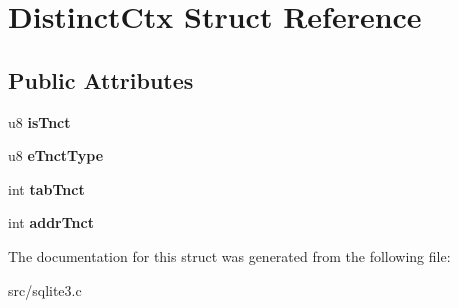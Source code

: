 \hypertarget{struct_distinct_ctx}{\section{Distinct\-Ctx Struct Reference}
\label{struct_distinct_ctx}
}
\subsection*{Public Attributes}
\begin{DoxyCompactItemize}
\item 
\hypertarget{struct_distinct_ctx_aaaa3b23ad86358ba11b4da77cd753bbd}{u8 {\bfseries is\-Tnct}}\label{struct_distinct_ctx_aaaa3b23ad86358ba11b4da77cd753bbd}

\item 
\hypertarget{struct_distinct_ctx_ae57f819b64420f943f21d8d0e9c36205}{u8 {\bfseries e\-Tnct\-Type}}\label{struct_distinct_ctx_ae57f819b64420f943f21d8d0e9c36205}

\item 
\hypertarget{struct_distinct_ctx_af4514e425f99659e97b2bbe756716517}{int {\bfseries tab\-Tnct}}\label{struct_distinct_ctx_af4514e425f99659e97b2bbe756716517}

\item 
\hypertarget{struct_distinct_ctx_a897fdd9a1025f3d6c438a5113cf925d2}{int {\bfseries addr\-Tnct}}\label{struct_distinct_ctx_a897fdd9a1025f3d6c438a5113cf925d2}

\end{DoxyCompactItemize}


The documentation for this struct was generated from the following file\-:\begin{DoxyCompactItemize}
\item 
src/sqlite3.\-c\end{DoxyCompactItemize}
